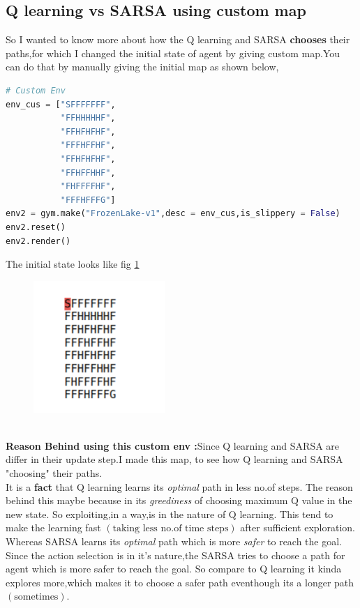 \documentclass[journal,12pt,onecolumn]{IEEEtran}
\theoremstyle{remark}
\numberwithin{equation}{section}
\begin{document}
  \subsection{Q learning vs SARSA using custom map}
    So I wanted to know more about how the Q learning and SARSA \textbf{chooses} their paths,for which I changed the initial state of agent by giving custom map.You can do that by manually giving the initial map as shown below,
       \begin{lstlisting}[language = Python]
# Custom Env
env_cus = ["SFFFFFFF",
           "FFHHHHHF",
           "FFHFHFHF",
           "FFFHFFHF",
           "FFHFHFHF",
           "FFHFFHHF",
           "FHFFFFHF",
           "FFFHFFFG"]
env2 = gym.make("FrozenLake-v1",desc = env_cus,is_slippery = False)
env2.reset()
env2.render()
\end{lstlisting}
    The initial state looks like fig \ref{ini_state2}
    \begin{figure}[ht]
       \centering
       \includegraphics[width = 5cm]{Figs/cur_state2.png}
       \caption{}
       \label{ini_state2}
      \end{figure}
  \\ \textbf{Reason Behind using this custom env :}Since Q learning and SARSA are differ in their update step.I made this map, to see how Q learning and SARSA "choosing"  
 their paths.\\
 It is a \textbf{fact} that Q learning learns its \emph{optimal} path in less no.of steps. The reason behind this maybe because in its \emph{greediness} of choosing maximum Q value in the new state. So exploiting,in a way,is in the nature of Q learning. This tend to make the learning fast $(\text{taking less no.of time steps})$ after sufficient exploration. Whereas SARSA learns its \emph{optimal} path which is more \emph{safer} to reach the goal. Since the action selection is in it's nature,the SARSA tries to choose a path for agent which is more safer to reach the goal. So compare to Q learning it kinda explores more,which makes it to choose a safer path eventhough its a longer path $(\text{sometimes})$.\\
\end{document}
